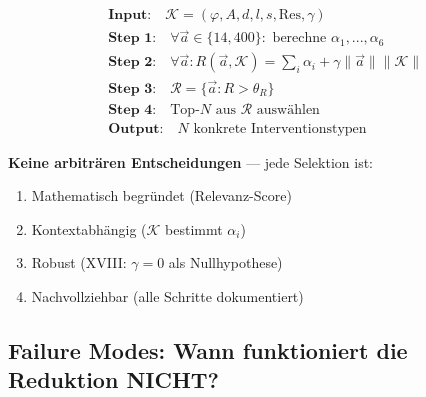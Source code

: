 \begin{tcolorbox}[colback=blue!5!white, colframe=blue!75!black,
    title=\textbf{Zusammenfassung: Der Reduktions-Algorithmus}]

\begin{equation*}
\boxed{
\begin{aligned}
&\textbf{Input:} \quad \mathcal{K} = (\varphi, A, d, l, s, \text{Res}, \gamma) \\[0.5em]
&\textbf{Step 1:} \quad \forall \vec{a} \in \{14{,}400\}: \text{ berechne } \alpha_1, ..., \alpha_6 \\[0.3em]
&\textbf{Step 2:} \quad \forall \vec{a}: R(\vec{a}, \mathcal{K}) = \sum_i \alpha_i + \gamma \|\vec{a}\| \|\mathcal{K}\| \\[0.3em]
&\textbf{Step 3:} \quad \mathcal{R} = \{\vec{a} : R > \theta_R\} \\[0.3em]
&\textbf{Step 4:} \quad \text{Top-}N \text{ aus } \mathcal{R} \text{ auswählen} \\[0.5em]
&\textbf{Output:} \quad N \text{ konkrete Interventionstypen}
\end{aligned}
}
\end{equation*}

\textbf{Keine arbiträren Entscheidungen} --- jede Selektion ist:
\begin{enumerate}[nosep]
    \item Mathematisch begründet (Relevanz-Score)
    \item Kontextabhängig ($\mathcal{K}$ bestimmt $\alpha_i$)
    \item Robust (XVIII: $\gamma = 0$ als Nullhypothese)
    \item Nachvollziehbar (alle Schritte dokumentiert)
\end{enumerate}

\end{tcolorbox}

\subsection{Failure Modes: Wann funktioniert die Reduktion NICHT?}
\label{sec:hhh-failure-modes}

